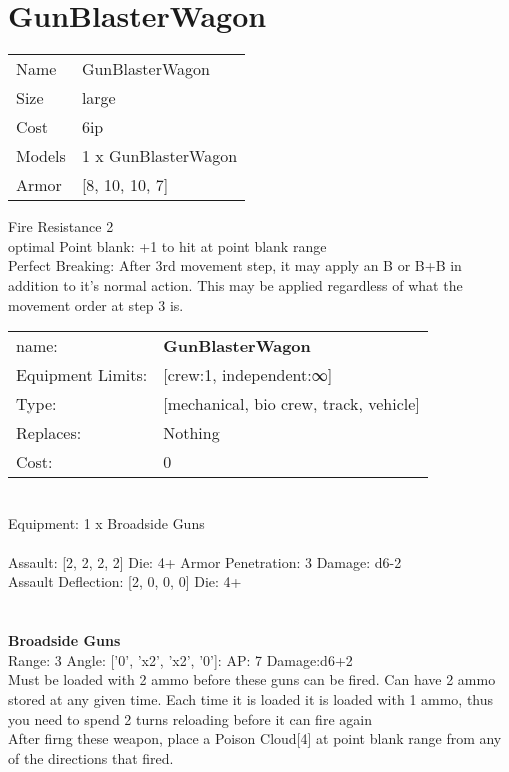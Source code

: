 \pagebreak\pagebreak

\section{ GunBlasterWagon }

\begin{tabular}{ll}
  Name & GunBlasterWagon \\
  Size & large\\
  Cost & 6ip\\
  Models & 1 x GunBlasterWagon\\
  Armor & [8, 10, 10, 7]\\
\end{tabular}

\noindent Fire Resistance 2\\ 
optimal Point blank: +1 to hit at point blank range\\ 
Perfect Breaking: After 3rd movement step, it may apply an B or B+B in addition to it's normal action. This may be applied regardless of what the movement order at step 3 is.\\ 


\noindent
\begin{tabular}{ll}
name: &{\bf GunBlasterWagon } \\
Equipment Limits: &[crew:1, independent:∞] \\
Type: &[mechanical, bio crew, track, vehicle] \\
Replaces: &Nothing \\
Cost: & 0\\
\end{tabular}
\ \\
Equipment: 1 x Broadside Guns \\
\ \\
Assault: [2, 2, 2, 2] Die: 4+ Armor Penetration: 3 Damage: d6-2 \\
Assault Deflection: [2, 0, 0, 0] Die: 4+\\
\indent  
\ \\

\ \\
{\bf Broadside Guns } \\



Range: 3  Angle: ['0', 'x2', 'x2', '0']: AP: 7 Damage:d6+2 \\
Must be loaded with 2 ammo before these guns can be fired. Can have 2 ammo stored at any given time. Each time it is loaded it is loaded with 1 ammo, thus you need to spend 2 turns reloading before it can fire again\\ 
After firng these weapon, place a Poison Cloud[4] at point blank range from any of the directions that fired.\\ 




